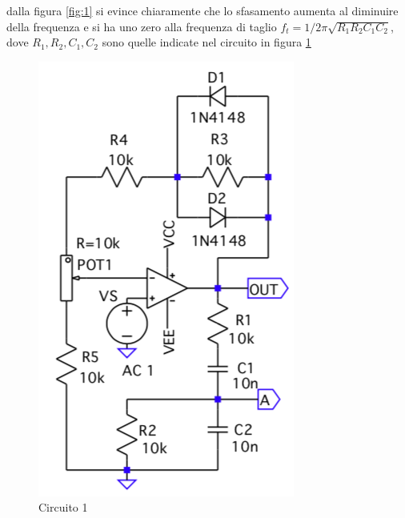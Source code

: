 \documentclass{article}
\begin{document}
	dalla figura \ref{fig:1} si evince chiaramente che lo sfasamento aumenta al diminuire della frequenza e si ha uno zero alla frequenza di taglio $f_t=1/2\pi\sqrt{R_1R_2C_1C_2}$, dove $R_1,R_2,C_1,C_2$ sono quelle indicate nel circuito in figura \ref{fig:circ1}
	\begin{figure}
		\centering
		\includegraphics[width=\linewidth]{figure/circ1.png}
		\caption{Circuito 1}
		\label{fig:circ1}
	\end{figure}
	
\end{document}
